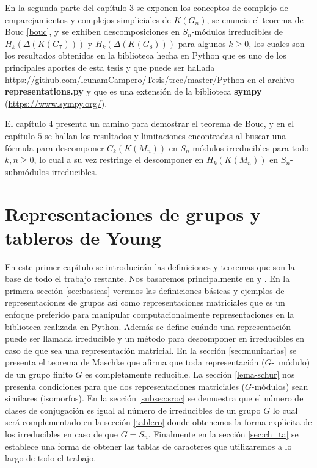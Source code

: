 \documentclass[12pt]{book}
\theoremstyle{definition}
\newcounter{in}
\newcounter{ini}
\begin{document}
En la segunda parte del capítulo $3$ se exponen los conceptos de complejo de emparejamientos y
complejos simpliciales de $K(G_n)$, se
enuncia el teorema de Bouc \ref{bouc}, y se exhiben
descomposiciones en $S_n$-módulos irreducibles de
$H_k(\Delta(K(G_7)))$ y $H_k(\Delta(K(G_8)))$ para algunos $k \geq 0$,
los cuales son los resultados obtenidos en la biblioteca hecha en Python
que es uno de los principales aportes de esta tesis y que puede ser hallada \url{https://github.com/leunamCampero/Tesis/tree/master/Python} en el
archivo \textbf{representations.py} y que es una extensión de la biblioteca
\textbf{sympy} (\url{https://www.sympy.org/}).


El capítulo $4$ presenta un camino para demostrar el teorema de Bouc, y en el capítulo $5$ se hallan los resultados y limitaciones encontradas al buscar una fórmula para descomponer $C_k(K(M_n))$ en $S_{n}$-módulos irreducibles para todo $k,n \geq 0$, lo cual a su vez restringe el descomponer en $H_k(K(M_n))$ en $S_n$-submódulos irreducibles.


\chapter[Representaciones]{Representaciones de grupos y tableros de Young}
\label{cha:Representaciones de grupos}

En este primer capítulo se introducirán las definiciones y teoremas
que son la base de todo el trabajo restante. Nos basaremos
principalmente en \cite{MR882540} y \cite{sagan2001symmetric}.  En la
primera sección \ref{sec:basicas} veremos las definiciones básicas y
ejemplos de representaciones de grupos así como representaciones
matriciales que es un enfoque preferido para manipular
computacionalmente representaciones en la biblioteca realizada en
Python. Además se define cuándo una representación puede ser llamada
irreducible y un método para descomponer en irreducibles en caso de
que sea una representación matricial. En la sección
\ref{sec:munitarias} se presenta el teorema de Maschke que afirma que
toda representación ($G$-~módulo) de un grupo finito $G$ es
completamente reducible. La sección \ref{lema-schur} nos presenta
condiciones para que dos representaciones matriciales ($G$-módulos)
sean similares (isomorfos). En la sección \ref{subsec:sroc} se
demuestra que el número de clases de conjugación es igual al número de
irreducibles de un grupo $G$ lo cual será complementado en la sección
\ref{tablero} donde obtenemos la forma explícita de los irreducibles en
caso de que $G = S_{n}$. Finalmente en la sección \ref{sec:ch_ta} se establece una forma de obtener
las tablas de caracteres que utilizaremos a lo largo de todo el
trabajo.
\end{document}
